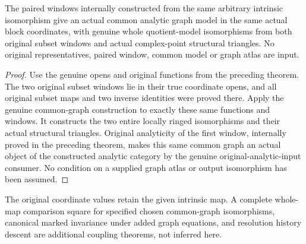 \begin{theorem}
\label{hir:actual-intrinsic-iso-common-analytic-graph-windows}
\leanok
The paired windows internally constructed from the same arbitrary intrinsic
isomorphism give an actual common analytic graph model in the same actual
block coordinates, with genuine whole quotient-model isomorphisms from both
original subset windows and actual complex-point structural triangles.
No original representatives, paired window, common model or graph atlas
are input.
\end{theorem}
\begin{proof}
Use the genuine opens and original functions from the preceding theorem.
The two original subset windows lie in their true coordinate opens, and
all original subset maps and two inverse identities were proved there.
Apply the genuine common-graph construction to exactly these same
functions and windows. It constructs the two entire locally ringed
isomorphisms and their actual structural triangles. Original analyticity
of the first window, internally proved in the preceding theorem, makes
this same common graph an actual object of the constructed analytic
category by the genuine original-analytic-input consumer. No condition
on a supplied graph atlas or output isomorphism has been assumed.
\end{proof}

The original coordinate values retain the given intrinsic map. A complete
whole-map comparison square for specified chosen common-graph isomorphisms,
canonical marked invariance under added graph equations, and resolution
history descent are additional coupling theorems, not inferred here.
